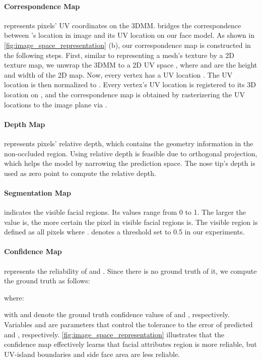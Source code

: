 \documentclass[10pt,twocolumn,letterpaper]{article}
\begin{document}
\vspace{-0.3cm}
\paragraph{Correspondence Map} 
 represents pixels' UV coordinates on the 3DMM. 
 bridges the correspondence between 's location  in image and its UV location  on our face model. 
As shown in \cref{fig:image_space_representation} (b), our correspondence map is constructed in the following steps.
First, similar to representing a mesh's texture by a 2D texture map, we unwrap the 3DMM to a 2D UV space , where  and  are the height and width of the 2D map. 
Now, every vertex has a UV location . 
The UV location is then normalized to .
Every vertex's UV location is registered to its 3D location on , and the correspondence map is obtained by rasterizering the UV locations to the image plane via . 

\vspace{-0.3cm}
\paragraph{Depth Map} 
 represents pixels' relative depth, which contains the geometry information in the non-occluded region. Using relative depth is feasible due to orthogonal projection, which helps the model by narrowing the prediction space. The nose tip's depth is used as zero point to compute the relative depth.



\vspace{-0.3cm}
\paragraph{Segmentation Map} 
 indicates the visible facial regions. 
Its values range from 0 to 1. 
The larger the value is, the more certain the pixel in visible facial regions is. 
The visible region  is defined as all pixels where . 
 denotes a threshold set to 0.5 in our experiments.

\vspace{-0.3cm}
\paragraph{Confidence Map} 
 represents the reliability of  and . Since there is no ground truth of it,  we compute the ground truth  as follows:

where:
\begin{small}

\end{small} 
\hspace{-0.18cm} with  and  denote the ground truth confidence values of  and , respectively. Variables  and  are parameters that control the tolerance to the error of predicted  and , respectively. 
\cref{fig:image_space_representation} illustrates that the confidence map effectively learns that facial attributes region is more reliable, but UV-island boundaries \cite{wood20223d} and side face area are less reliable.
\end{document}
